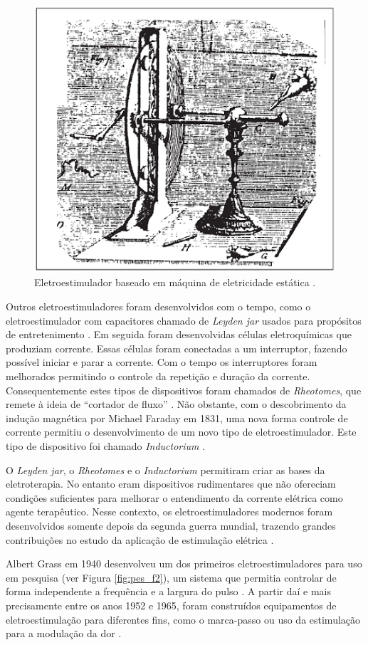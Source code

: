 \begin{figure}
    \centering %
    \includegraphics[width=0.4\linewidth]{figs/Fig_c3/ma_f1}
    \caption{Eletroestimulador baseado em máquina de eletricidade estática \cite{Geddes1994TheBiology}.}
    \label{fig:ma_f1}
\end{figure}

Outros eletroestimuladores foram desenvolvidos com o tempo, como o eletroestimulador com capacitores chamado de \textit{Leyden jar} usados para propósitos de entretenimento \cite{Geddes1994TheBiology}. Em seguida foram desenvolvidas células eletroquímicas que produziam corrente. Essas células foram conectadas a um interruptor, fazendo possível iniciar e parar a corrente. Com o tempo os interruptores foram melhorados permitindo o controle da repetição e duração da corrente. Consequentemente estes tipos de dispositivos foram chamados de \textit{Rheotomes}, que remete à ideia de “cortador de fluxo” \cite{Geddes1994TheBiology}. Não obstante, com o descobrimento da indução magnética por Michael Faraday em 1831, uma nova forma controle de corrente permitiu o desenvolvimento de um novo tipo de eletroestimulador. Este tipo de dispositivo foi chamado \textit{Inductorium} \cite{Geddes1994TheBiology}.

O \textit{Leyden jar}, o \textit{Rheotomes} e o \textit{Inductorium} permitiram criar as bases da eletroterapia. No entanto eram dispositivos rudimentares que não ofereciam condições suficientes para melhorar o entendimento da corrente elétrica como agente terapêutico. Nesse contexto, os eletroestimuladores modernos foram desenvolvidos somente depois da segunda guerra mundial, trazendo grandes contribuições no estudo da aplicação de estimulação elétrica \cite{Faria2006ImplementacaoMedulares}. 

Albert Grass em 1940 desenvolveu um dos primeiros eletroestimuladores para uso em pesquisa (ver Figura \ref{fig:pes_f2}), um sistema que permitia controlar de forma independente a frequência e a largura do pulso \cite{Geddes1994TheBiology}. A partir daí e mais precisamente entre os anos 1952 e 1965, foram construídos equipamentos de eletroestimulação para diferentes fins, como o marca-passo ou uso da estimulação para a modulação da dor \cite{Faria2006ImplementacaoMedulares}.  


